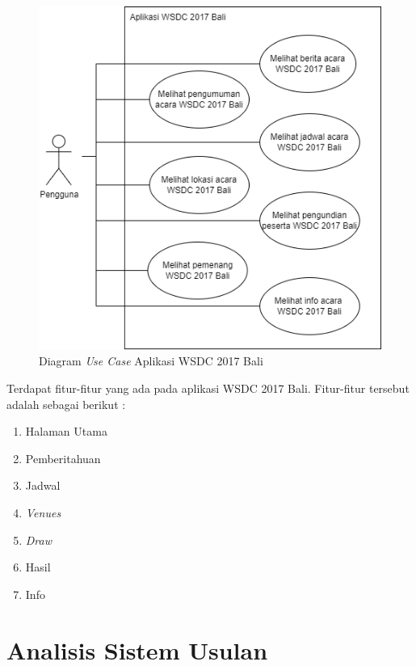 \begin{figure}[H]
		\centering
	    \includegraphics[scale=0.4]{Gambar/useCaseDiagram.png}
	    \caption{Diagram {\it Use Case} Aplikasi WSDC 2017 Bali}
	    \label{fig:useCaseDiagram}
\end{figure}

Terdapat fitur-fitur yang ada pada aplikasi WSDC 2017 Bali. Fitur-fitur tersebut adalah sebagai berikut :
\begin{enumerate}
	\item Halaman Utama
	\item Pemberitahuan
	\item Jadwal 
	\item {\it Venues}
	\item {\it Draw}
	\item Hasil
	\item Info
\end{enumerate}

\section{Analisis Sistem Usulan}
\label{sec:analisisSistemUsulan}